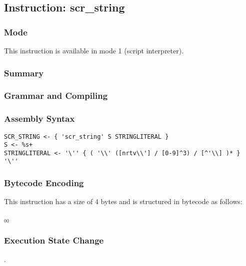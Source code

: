 \subsection{Instruction: scr\_string}

\subsubsection{Mode}
This instruction is available in mode 1 (script interpreter).
\subsubsection{Summary}


\subsubsection{Grammar and Compiling}


\subsubsection{Assembly Syntax}

\begin{myquote}
\begin{verbatim}
SCR_STRING <- { 'scr_string' S STRINGLITERAL }
S <- %s+
STRINGLITERAL <- '\'' { ( '\\' ([nrtv\\'] / [0-9]^3) / [^'\\] )* } '\''
\end{verbatim}
\end{myquote}

\subsubsection{Bytecode Encoding}

This instruction has a size of 4 bytes and is structured in bytecode as follows:

$_{00}$\ 

\subsubsection{Execution State Change}

.


